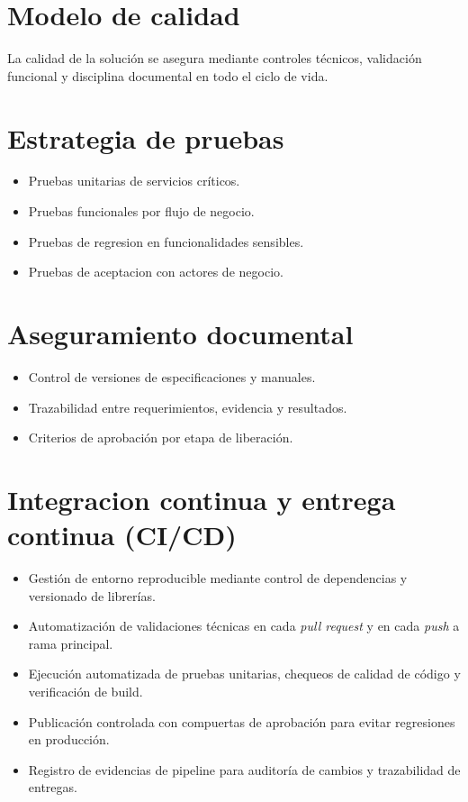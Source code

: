\section{Modelo de calidad}
La calidad de la solución se asegura mediante controles técnicos, validación funcional y disciplina documental en todo el ciclo de vida.

\section{Estrategia de pruebas}
\begin{itemize}
  \item Pruebas unitarias de servicios críticos.
  \item Pruebas funcionales por flujo de negocio.
  \item Pruebas de regresion en funcionalidades sensibles.
  \item Pruebas de aceptacion con actores de negocio.
\end{itemize}

\section{Aseguramiento documental}
\begin{itemize}
  \item Control de versiones de especificaciones y manuales.
  \item Trazabilidad entre requerimientos, evidencia y resultados.
  \item Criterios de aprobación por etapa de liberación.
\end{itemize}

\section{Integracion continua y entrega continua (CI/CD)}
\begin{itemize}
  \item Gestión de entorno reproducible mediante control de dependencias y versionado de librerías.
  \item Automatización de validaciones técnicas en cada \textit{pull request} y en cada \textit{push} a rama principal.
  \item Ejecución automatizada de pruebas unitarias, chequeos de calidad de código y verificación de build.
  \item Publicación controlada con compuertas de aprobación para evitar regresiones en producción.
  \item Registro de evidencias de pipeline para auditoría de cambios y trazabilidad de entregas.
\end{itemize}

